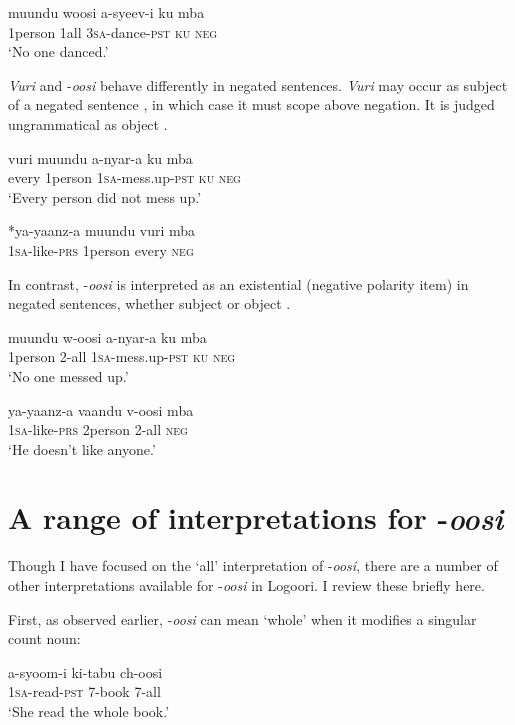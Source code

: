 \documentclass[output=paper]{langsci/langscibook}
\begin{document}
\ea
\gll muundu   woosi  a-syeev-i    ku  mba\\
     1person\textsc{}    1all    3\textsc{sa}-dance-\textsc{pst}  \textsc{ku}  \textsc{neg} \\
\glt ‘No one danced.’
\z

  \textit{Vuri} and -\textit{oosi} behave differently in negated sentences. \textit{Vuri} may occur as subject of a negated sentence , in which case it must scope above negation. It is judged ungrammatical as object .

\ea 
\gll vuri  muundu  a-nyar-a    ku  mba  \\
     every  1person  1\textsc{sa}-mess.up-\textsc{pst}  \textsc{ku}  \textsc{neg}\\
\glt ‘Every person did not mess up.’        
\z

\ea
\gll \textup{*}ya-yaanz-a  muundu   vuri    mba \\
     1\textsc{sa}-like-\textsc{prs}  1person     every    \textsc{neg}\\
\z

  In contrast, -\textit{oosi} is interpreted as an existential (negative polarity item) in negated sentences, whether subject  or object .

\ea 
\gll muundu  w-oosi    a-nyar-a    ku  mba  \\
     1person  2-all    1\textsc{sa}-mess.up-\textsc{pst}  \textsc{ku  neg}\\
\glt ‘No one messed up.’        
\z

\ea
\gll ya-yaanz-a  vaandu   v-oosi    mba \\
     1\textsc{sa}-like-\textsc{prs}  2person     2-all    \textsc{neg}\\
\glt ‘He doesn't like anyone.’
\z

\section{A range of interpretations for -\textit{oosi}}

Though I have focused on the ‘all’ interpretation of -\textit{oosi}, there are a number of other interpretations available for -\textit{oosi} in Logoori. I review these briefly here.

  First, as observed earlier, -\textit{oosi} can mean ‘whole’ when it modifies a singular count noun:

\ea
\gll a-syoom-i  ki-tabu  ch-oosi\\
     1\textsc{sa}-read-\textsc{pst}    7-book \textsc{7-}all \\
\glt ‘She read the whole book.’
\z
\end{document}
